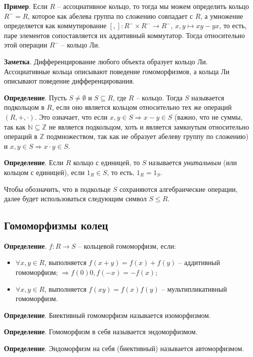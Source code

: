 \documentclass[a4paper]{book}
\begin{document}
\textbf{Пример}. Если $R$ -- ассоциативное кольцо, то тогда мы можем определить кольцо $R^{-} = R$, которое как абелева группа по сложению совпадает с $R$, а умножение определяется как коммутирование $[,]: R^{-} \times R^{-} \rightarrow R^{-}$, $x,y \mapsto xy - yx$, то есть, паре элементов сопоставляется их аддитивный коммутатор. Тогда относительно этой операции $R^{-}$ -- кольцо Ли. 

\textbf{Заметка}. Дифференцирование любого объекта образует кольцо Ли. Ассоциативные кольца описывают поведение гомоморфизмов, а кольца Ли описывают поведение дифференцирования. 

\textbf{Определение}. Пусть $S \neq \emptyset$ и $S \subseteq R$, где $R$ -- кольцо. Тогда $S$ называется подкольцом в $R$, если оно является кольцом относительно тех же операций $(R,+,\cdot)$. Это означает, что если $x,y\in S \Rightarrow x-y\in S$ (важно, что не суммы, так как $\mathbb{N}\subseteq\mathbb{Z}$ не является подкольцом, хоть и является замкнутым относительно операций в $\mathbb{Z}$ подмножеством, так как не образует абелеву группу по сложению) и $x,y\in S \Rightarrow x\cdot y\in S$. 

\textbf{Определение}. Если $R$ кольцо с единицей, то $S$ называется \textit{унитальным} (или кольцом с единицей), если $1_R\in S$, то есть, $1_R = 1_S$. 

Чтобы обозначить, что в подкольце $S$ сохраняются алгебраические операции, далее будет использоваться следующим символ $S \leqslant R$. 

\subsection{Гомоморфизмы колец}

\textbf{Определение}. $f: R\rightarrow S$ -- кольцевой гомоморфизм, если: 
\begin{itemize}
	\item $\forall x,y\in R$, выполняется $f(x+y) = f(x) + f(y)$ -- аддитивный гомоморфизм; $\Rightarrow f(0) 0, f(-x) = -f(x)$;
	\item $\forall x,y\in R$, выполняется $f(xy) = f(x)f(y)$ -- мультипликативный гомоморфизм. 
\end{itemize}


\textbf{Определение}. Биективный гомоморфизм называется изоморфизмом. 

\textbf{Определение}. Гомоморфизм в себя называется эндоморфизмом. 

\textbf{Определение}. Эндоморфизм на себя (биективный) называется автоморфизмом. 
\end{document}
